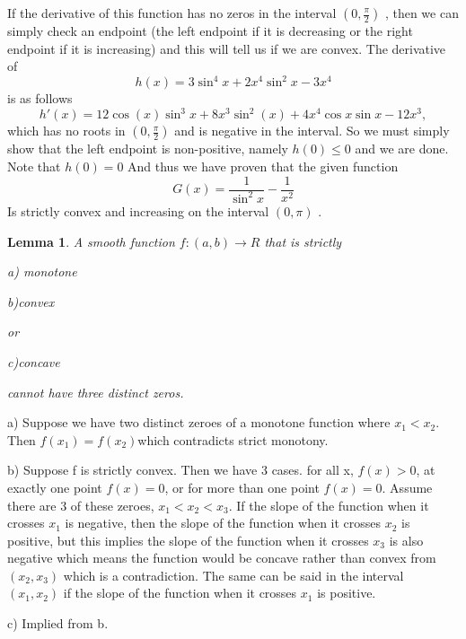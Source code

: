 \documentclass[12pt]{report}
\newtheorem{lemma}[theorem]{Lemma}
\numberwithin{definition}{section}
\begin{document}
 
   
 If the derivative of this function has no zeros in the interval $(0, \frac{\pi}{2})$ , then we can simply check an endpoint (the left endpoint if it is decreasing or the right endpoint if it is increasing) and this will tell us if we are convex. The derivative of 
 \[h(x) = 3\sin^4{x}+2x^4\sin^2{x}-3x^4\] 
 is as follows 
  \[h'(x) = 12\cos(x)\sin^3{x}+8x^3\sin^2(x)+4x^4\cos{x}\sin{x} -12x^3,	\] 
  which has no roots in $(0, \frac{\pi}{2})$  and is negative in the interval. So we must simply show that the left endpoint is non-positive, namely $h(0)\leq 0$ and we are done. Note that  $h(0)=0$ And thus we have proven that the given function
    \[G(x) = \frac{1}{\sin^2{x}}-\frac{1}{x^2}            \]
 Is strictly convex and increasing on the interval  $(0, \pi)$ . 

\begin{lemma}
   A smooth function $f : (a, b) \rightarrow R$ that is strictly 
 
 a) monotone
 
 b)convex
 
 or 
 
 c)concave 
 
 cannot have three distinct zeros. 
 
     
   
\end{lemma}
   
 

  a) Suppose we have two distinct zeroes of a monotone function where $x_1<x_2$. Then $f(x_1) = f(x_2) $which contradicts strict monotony.
 
    
  
 b) Suppose f is strictly convex. Then we have 3 cases. for all x, $f(x)>0$, at exactly one point $f(x)=0$, or for more than one point  $f(x)=0$.  Assume there are 3 of these zeroes,  $x_1< x_2< x_3$. If the slope of the function when it crosses $x_1$ is negative, then the slope of the function when it crosses $x_2$ is positive, but this implies the slope of the function when it crosses $x_3$ is also negative which means the function would be concave rather than convex from $(x_2, x_3)$ which is a contradiction. The same can be said in the interval $(x_1, x_2)$ if the slope of the function when it crosses $x_1$ is positive. 
 
     
   
   
 c) Implied from b. 
 
 
\end{document}
